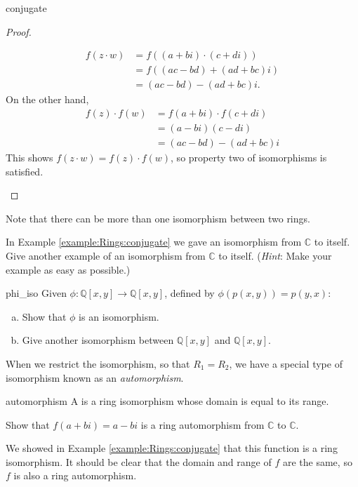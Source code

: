 \begin{example}{conjugate}
\begin{proof}{}
\begin{enumerate}[(1)]
\begin{align*}
  f(z\cdot w)&=f((a+bi)\cdot(c+di))\\
  &=f((ac-bd)+(ad+bc)i)\\
  &=(ac-bd)-(ad+bc)i.
\end{align*}
On the other hand,
\begin{align*}
f(z)\cdot f(w)&=f(a+bi)\cdot f(c+di)\\
&=(a-bi)(c-di)\\
&=(ac-bd)-(ad+bc)i
\end{align*}
This shows $f(z\cdot w)=f(z)\cdot f(w)$, so property two of isomorphisms is satisfied.
\end{enumerate}
\end{proof}
\end{example}

Note that there can be more than one isomorphism between two rings.

\begin{exercise}{}
In Example \ref{example:Rings:conjugate} we gave an isomorphism from ${\mathbb C}$ to itself.  Give another example of an isomorphism from ${\mathbb C}$ to itself.  (\emph{Hint}:  Make your example as easy as possible.)
\end{exercise}

\begin{exercise}{phi_iso}
Given $\phi:  {\mathbb Q}[x,y]\rightarrow{\mathbb Q}[x,y]$, defined by $\phi(p(x,y))=p(y,x)$:
\begin{enumerate}[(a)]
\item Show that $\phi$ is an isomorphism.
\item Give another isomorphism between ${\mathbb Q}[x,y]$ and ${\mathbb Q}[x,y]$.
\end{enumerate}
\end{exercise}

When we restrict the isomorphism, so that $R_1=R_2$, we have a special type of isomorphism known as an \emph{automorphism}.

\begin{defn}{automorphism}
A  is a ring isomorphism whose domain is equal to its range.
\end{defn}

\begin{example}{}
Show that $f(a+bi)=a-bi$ is a ring automorphism from ${\mathbb C}$ to ${\mathbb C}$.

We showed in Example \ref{example:Rings:conjugate} that this function is a ring isomorphism.  It should be clear that the domain and range of $f$ are the same, so $f$ is also a ring automorphism.  
\end{example}

